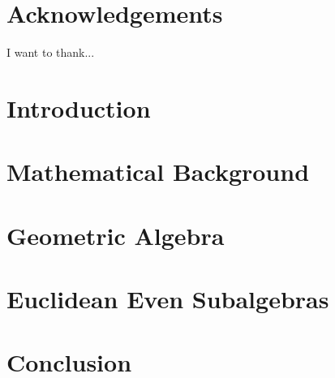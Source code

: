 \documentclass[12pt]{report}
\theoremstyle{definition}
\theoremstyle{definition}
\theoremstyle{remark}
\begin{document}




\chapter*{Acknowledgements}
I want to thank...

\tableofcontents
\listoftables

\chapter{Introduction}


\chapter{Mathematical Background}


\chapter{Geometric Algebra}\label{ch:ga}


\chapter{Euclidean Even Subalgebras}\label{ch:euclidean-even}


\chapter{Conclusion}


\printbibliography
\end{document}

